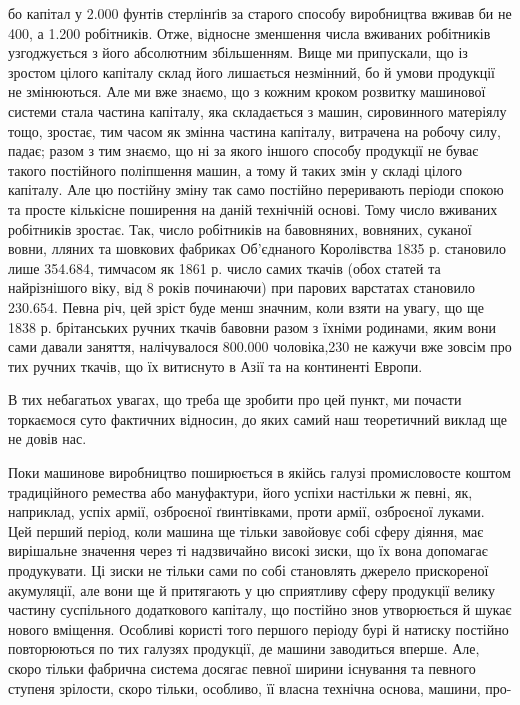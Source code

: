 \parcont{}  %
бо капітал у 2.000 фунтів стерлінґів за старого способу виробництва
вживав би не 400, а 1.200 робітників. Отже, відносне зменшення
числа вживаних робітників узгоджується з його абсолютним
збільшенням. Вище ми припускали, що із зростом цілого
капіталу склад його лишається незмінний, бо й умови продукції
не змінюються. Але ми вже знаємо, що з кожним кроком розвитку
машинової системи стала частина капіталу, яка складається з
машин, сировинного матеріялу тощо, зростає, тим часом як
змінна частина капіталу, витрачена на робочу силу, падає; разом
з тим знаємо, що ні за якого іншого способу продукції не буває
такого постійного поліпшення машин, а тому й таких змін у
складі цілого капіталу. Але цю постійну зміну так само постійно
переривають періоди спокою та просте кількісне поширення на
даній технічній основі. Тому число вживаних робітників зростає.
Так, число робітників на бавовняних, вовняних, суканої вовни,
лляних та шовкових фабриках Об’єднаного Королівства 1835 р.
становило лише 354.684, тимчасом як 1861 р. число самих ткачів
(обох статей та найрізнішого віку, від 8 років починаючи) при
парових варстатах становило 230.654. Певна річ, цей зріст буде
менш значним, коли взяти на увагу, що ще 1838 р. брітанських
ручних ткачів бавовни разом з їхніми родинами, яким вони сами
давали заняття, налічувалося 800.000 чоловіка,230 не кажучи вже
зовсім про тих ручних ткачів, що їх витиснуто в Азії та на континенті
Европи.

В тих небагатьох увагах, що треба ще зробити про цей пункт,
ми почасти торкаємося суто фактичних відносин, до яких самий
наш теоретичний виклад ще не довів нас.

Поки машинове виробництво поширюється в якійсь галузі промисловосте
коштом традиційного ремества або мануфактури, його
успіхи настільки ж певні, як, наприклад, успіх армії, озброєної
ґвинтівками, проти армії, озброєної луками. Цей перший період,
коли машина ще тільки завойовує собі сферу діяння, має вирішальне
значення через ті надзвичайно високі зиски, що їх вона
допомагає продукувати. Ці зиски не тільки сами по собі становлять
джерело прискореної акумуляції, але вони ще й притягають у
цю сприятливу сферу продукції велику частину суспільного додаткового
капіталу, що постійно знов утворюється й шукає нового
вміщення. Особливі користі того першого періоду бурі й натиску
постійно повторюються по тих галузях продукції, де
машини заводиться вперше. Але, скоро тільки фабрична система
досягає певної ширини існування та певного ступеня зрілости,
скоро тільки, особливо, її власна технічна основа, машини, про-

